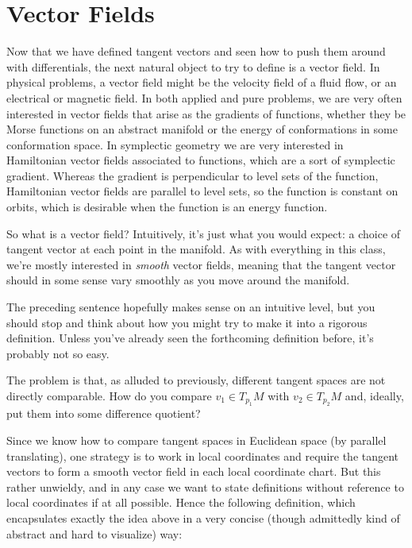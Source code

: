 
\section{Vector Fields}

Now that we have defined tangent vectors and seen how to push them around with differentials, the next natural object to try to define is a vector field. In physical problems, a vector field might be the velocity field of a fluid flow, or an electrical or magnetic field. In both applied and pure problems, we are very often interested in vector fields that arise as the gradients of functions, whether they be Morse functions on an abstract manifold or the energy of conformations in some conformation space. In symplectic geometry we are very interested in Hamiltonian vector fields associated to functions, which are a sort of symplectic gradient. Whereas the gradient is perpendicular to level sets of the function, Hamiltonian vector fields are parallel to level sets, so the function is constant on orbits, which is desirable when the function is an energy function.

So what is a vector field? Intuitively, it's just what you would expect: a choice of tangent vector at each point in the manifold. As with everything in this class, we're mostly interested in \emph{smooth} vector fields, meaning that the tangent vector should in some sense vary smoothly as you move around the manifold.

The preceding sentence hopefully makes sense on an intuitive level, but you should stop and think about how you might try to make it into a rigorous definition. Unless you've already seen the forthcoming definition before, it's probably not so easy.

The problem is that, as alluded to previously, different tangent spaces are not directly comparable. How do you compare $v_1 \in T_{p_1}M$ with $v_2 \in T_{p_2}M$ and, ideally, put them into some difference quotient? 

Since we know how to compare tangent spaces in Euclidean space (by parallel translating), one strategy is to work in local coordinates and require the tangent vectors to form a smooth vector field in each local coordinate chart. But this rather unwieldy, and in any case we want to state definitions without reference to local coordinates if at all possible. Hence the following definition, which encapsulates exactly the idea above in a very concise (though admittedly kind of abstract and hard to visualize) way:

